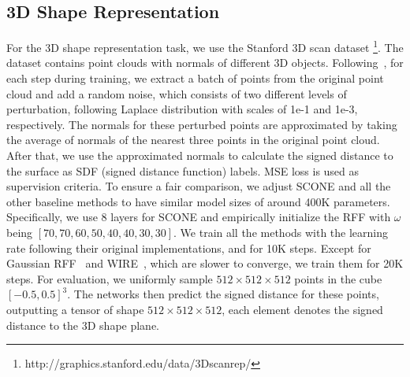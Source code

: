 \documentclass[letterpaper]{article} %
\begin{document}
\begin{table}[ht]
\begin{center}
\end{center}
\caption{Results on video representation task. The mean $\pm$ standard deviation across all frames is reported. SCONE achieves the best performance in terms of PSNR. It ties with SIREN in SSIM, but with smaller variance across frames.}
\label{tab:video_results}
\end{table}



\subsection{3D Shape Representation}
\label{subsec:3dshape}
For the 3D shape representation task, we use the Stanford 3D scan dataset \footnote[2]{http://graphics.stanford.edu/data/3Dscanrep/}. The dataset contains point clouds with normals of different 3D objects. Following~\cite{lindell2022bacon}, for each step during training, we extract a batch of points from the original point cloud and add a random noise, which consists of two different levels of perturbation, following Laplace distribution with scales of 1e-1 and 1e-3, respectively. The normals for these perturbed points are approximated by taking the average of normals of the nearest three points in the original point cloud. After that, we use the approximated normals to calculate the signed distance to the surface as SDF (signed distance function) labels. MSE loss is used as supervision criteria. To ensure a fair comparison, we adjust SCONE and all the other baseline methods to have similar model sizes of around 400K parameters. Specifically, we use 8 layers for SCONE and empirically initialize the RFF with $\omega$ being $[70, 70, 60, 50, 40, 40, 30, 30]$. We train all the methods with the learning rate following their original implementations, and for 10K steps. Except for Gaussian RFF~\cite{tancik2020fourier} and WIRE~\cite{saragadam2023wire}, which are slower to converge, we train them for 20K steps. For evaluation, we uniformly sample $512\times 512 \times 512$ points in the cube $[-0.5, 0.5]^3$. The networks then predict the signed distance for these points, outputting a tensor of shape $512\times 512 \times 512$, each element denotes the signed distance to the 3D shape plane.
\end{document}

